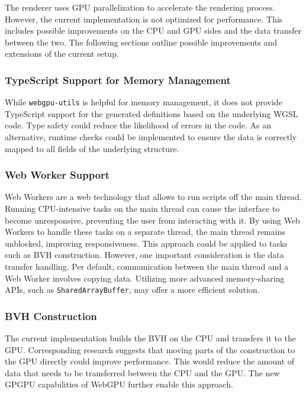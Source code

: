 The renderer uses \gls{GPU} parallelization to accelerate the rendering process. However, the current implementation is not optimized for performance. This includes possible improvements on the \gls{CPU} and \gls{GPU} sides and the data transfer between the two. The following sections outline possible improvements and extensions of the current setup.

\subsubsection*{TypeScript Support for Memory Management}

While \texttt{webgpu-utils} \cite{webgpuUtilsLib} is helpful for memory management, it does not provide TypeScript support for the generated definitions based on the underlying \gls{WGSL} code. Type safety could reduce the likelihood of errors in the code. As an alternative, runtime checks could be implemented to ensure the data is correctly mapped to all fields of the underlying structure.

\subsubsection*{Web Worker Support}

Web Workers are a web technology that allows to run scripts off the main thread. Running \gls{CPU}-intensive tasks on the main thread can cause the interface to become unresponsive, preventing the user from interacting with it. By using Web Workers to handle these tasks on a separate thread, the main thread remains unblocked, improving responsiveness. This approach could be applied to tasks such as \gls{BVH} construction. However, one important consideration is the data transfer handling. Per default, communication between the main thread and a Web Worker involves copying data. Utilizing more advanced memory-sharing \glspl{API}, such as \texttt{SharedArrayBuffer}, may offer a more efficient solution.

\subsubsection*{BVH Construction}
\label{sec:bvhConstructionDiscussion}

The current implementation builds the \gls{BVH} on the \gls{CPU} and transfers it to the \gls{GPU}. Corresponding research \cite{lauterbach2009GPUbvh} suggests that moving parts of the construction to the \gls{GPU} directly could improve performance. This would reduce the amount of data that needs to be transferred between the \gls{CPU} and the \gls{GPU}. The new \gls{GPGPU} capabilities of \gls{WebGPU} further enable this approach.

